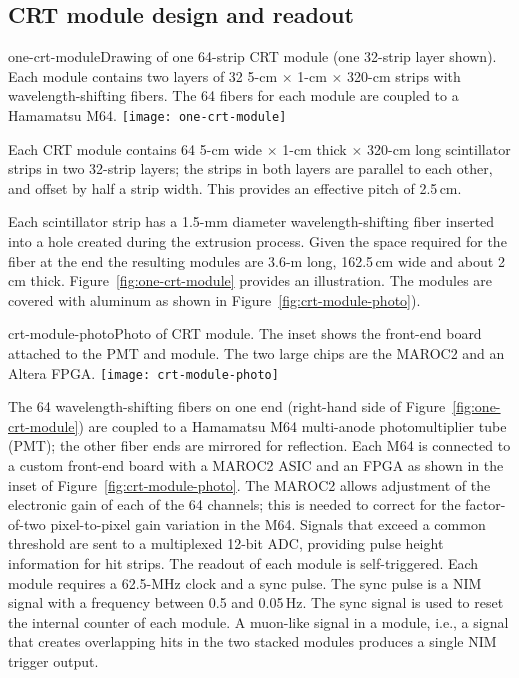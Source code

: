 \subsection{CRT module design and readout}

\begin{cdrfigure}{one-crt-module}{Drawing of one 64-strip CRT module (one 32-strip layer shown).  Each module contains two layers of 32 5-cm $\times$ 1-cm $\times$ 320-cm strips with wavelength-shifting fibers.  The 64 fibers for each module are coupled to a Hamamatsu M64.}
  \texttt{[image: one-crt-module]}
\end{cdrfigure}

Each CRT module contains 64 5-cm wide $\times$ 1-cm thick $\times$ 320-cm long scintillator strips in two 32-strip layers; the strips in both layers are parallel to each other, and offset by half a strip width. This provides an effective pitch of 2.5\,cm. 

Each scintillator strip has a 1.5-mm diameter wavelength-shifting fiber inserted into a hole created during the extrusion process.   Given the space required for the fiber at the end %
the resulting modules are 3.6-m long, 162.5\,cm wide and about 2\,cm thick. Figure~\ref{fig:one-crt-module} provides an illustration. The modules are covered with aluminum as shown in Figure~\ref{fig:crt-module-photo}). 


\begin{cdrfigure}{crt-module-photo}{Photo of CRT module. The inset shows the front-end board attached to the PMT and module. The two large chips are the MAROC2 and an Altera FPGA.}
  \texttt{[image: crt-module-photo]}
\end{cdrfigure}


The 64 wavelength-shifting fibers on one end (right-hand side of  Figure~\ref{fig:one-crt-module})
are coupled to a Hamamatsu M64 multi-anode photomultiplier tube (PMT); the other fiber ends are mirrored for reflection. 
Each M64 is connected to a custom front-end board with a MAROC2 ASIC and an FPGA as shown in the inset of Figure~\ref{fig:crt-module-photo}.
The MAROC2 allows adjustment of the electronic gain of each of the 64 channels; this is needed to correct for the factor-of-two pixel-to-pixel gain variation in the M64.  Signals that exceed a common threshold are sent to a multiplexed 12-bit ADC, providing pulse height information for hit strips. The readout of each module is self-triggered. Each module requires a 62.5-MHz clock and a sync pulse. The sync pulse is a NIM signal with
a frequency between 0.5 and 0.05\,Hz. The sync signal is used to reset the internal counter of each module. 
A muon-like signal in a module, i.e., a signal that creates overlapping hits in the two stacked modules produces a single NIM trigger output.


